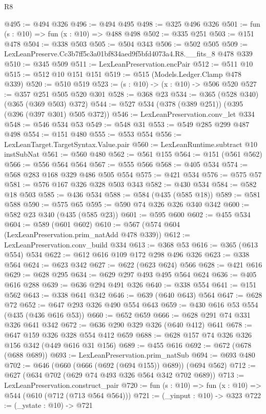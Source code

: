 \begin{lexlean}{R8}
\begin{coremodule}
@495 := @494 @326
@496 := @494 @495
@498 := @325 @496 @326
@501 := fun (s : @10) => fun (x : @10) => @488 @498
@502 := @335 @251
@503 := @151 @478
@504 := @338 @503
@505 := @504 @343
@506 := @502 @505
@509 := LexLeanPreserve.Cc3b7ff5c3a01bf834aed9f5bfd4073a4.R8.__fits_8 @478 @339
@510 := @345 @509
@511 := LexLeanPreservation.encPair
@512 := @511 @10
@515 := @512 @10 @151 @151
@519 := @515 (Models.Ledger.Clamp @478 @339)
@520 := @510 @519
@523 := (s : @10) -> (x : @10) -> @506 @520
@527 := @357 @251 @505 @520 @301
@528 := @368 @23
@534 := @365 (@528 @340) (@365 (@369 @503) @372)
@544 := @527 @534 (@378 (@389 @251)) (@395 (@396 (@397 @301) @505 @372))
@546 := LexLeanPreservation.conv_let @334
@548 := @546 @534 @53
@549 := @548 @31
@553 := @549 @285 @299 @487 @498
@554 := @151 @480
@555 := @553 @554
@556 := LexLeanTarget.TargetSyntax.Value.pair
@560 := LexLeanRuntime.subtract @10 instSubNat
@561 := @560 @480
@562 := @561 @155
@564 := @151 (@561 @562)
@566 := @556 @564 @564
@567 := @555 @566
@568 := @405 @534
@574 := @568 @283 @168 @329 @486 @505 @554
@575 := @421 @534
@576 := @575 @57
@581 := @576 @167 @326 @328 @503 @343
@582 := @430 @534
@584 := @582 @18 @503
@585 := @436 @534
@588 := @584 (@435 (@585 @18))
@589 := @581 @588
@590 := @575 @65
@595 := @590 @74 @326 @326 @340 @342
@600 := @582 @23 @340 (@435 (@585 @23))
@601 := @595 @600
@602 := @455 @534
@604 := @589 (@601 @602)
@610 := @567 (@574 @604 (LexLeanPreservation.prim_natAdd @478 @339))
@612 := LexLeanPreservation.conv_build @334
@613 := @368 @53
@616 := @365 (@613 @554) @534
@622 := @612 @616 @109 @172 @298 @496 @326
@623 := @338 @564
@624 := @623 @342
@627 := @622 (@623 @624) @566
@628 := @421 @616
@629 := @628 @295
@634 := @629 @297 @493 @495 @564 @624
@636 := @405 @616 @288
@639 := @636 @294 @491 @326
@640 := @338 @554
@641 := @151 @562
@643 := @338 @641 @342
@646 := @639 (@640 @643) @564
@647 := @628 @72
@652 := @647 @293 @326 @490 @554 @643
@659 := @430 @616 @53 @554 (@435 (@436 @616 @53))
@660 := @652 @659
@666 := @628 @291 @74 @331 @326 @641 @342
@672 := @636 @290 @329 @326 (@640 @412) @641
@678 := @647 @159 @326 @328 @554 @412 @659
@688 := @628 @157 @74 @326 @326 @156 @342 (@449 @616 @31 @156)
@689 := @455 @616
@692 := @672 (@678 (@688 @689))
@693 := LexLeanPreservation.prim_natSub
@694 := @693 @480
@702 := @646 (@660 (@666 (@692 (@694 @155)) @689)) (@694 @562)
@712 := @627 (@634 @702 (@629 @74 @493 @326 @564 @342 @702 @689))
@713 := LexLeanPreservation.construct_pair
@720 := fun (s : @10) => fun (x : @10) => @544 (@610 (@712 (@713 @564 @564)))
@721 := (_yinput : @10) -> @323
@722 := (_ystate : @10) -> @721

\end{coremodule}
\end{lexlean}
